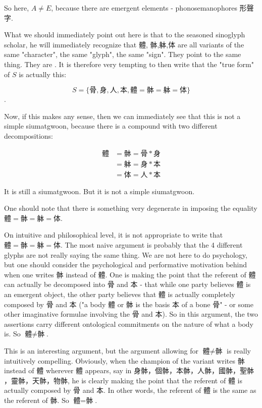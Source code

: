 So here, $A\neq E$, because there are emergent elements - phonosemanophores 形聲字. 

What we should immediately point out here is that to the seasoned sinoglyph scholar, he will immediately recognize that 體, 骵,躰,体 are all variants of the same "character", the same "glyph", the same "sign". They point to the same thing. They are . It is therefore very tempting to then write that the "true form" of $S$ is actually this:



$$S=\{\text{骨}, \text{身}, \text{人}, \text{本}, \text{體} = \text{骵} = \text{躰} = \text{体}\}$$.

Now, if this makes any sense, then we can immediately see that this is not a simple siumatgwoon, because there is a compound with two different decompositions: 


\begin{align}
    \text{體} &= \text{骵} = \text{骨} * \text{身} \\
             &= \text{躰} = \text{身} * \text{本} \\
             &= \text{体} = \text{人} * \text{本}
\end{align}
    
It is still a siumatgwoon. But it is not a simple siumatgwoon. 

One should note that there is something very degenerate in imposing the equality $\text{體} = \text{骵} = \text{躰} = \text{体}$. 

On intuitive and philosophical level, it is not appropriate to write that $\text{體} = \text{骵} = \text{躰} = \text{体}$. The most naive argument is probably that the 4 different glyphs are not really saying the same thing. We are not here to do psychology, but one should consider the psychological and performative motivation behind when one writes $\text{骵}$ instead of $\text{體}$. One is making the point that the referent of $\text{體}$ can actually be decomposed into $\text{骨}$ and $\text{本}$ - that while one party believes $\text{體}$ is an emergent object, the other party believes that $\text{體}$ is actually completely composed by $\text{骨}$ and $\text{本}$ ("a body 體 or 骵 is the basis 本 of a bone 骨" - or some other imaginative formulae involving the 骨 and 本). So in this argument, the two assertions carry different ontological commitments on the nature of what a body is. So $\text{體} \neq \text{骵}$.

This is an interesting argument, but the argument allowing for $\text{體} \neq \text{骵}$ is really intuitively compelling. Obviously, when the champion of the variant writes $\text{骵}$ instead of $\text{體}$ wherever $\text{體}$ appears, say in $\text{身骵}$，$\text{個骵}$，$\text{本骵}$，$\text{人骵}$，$\text{國骵}$，$\text{聖骵}$，$\text{靈骵}$，$\text{天骵}$，$\text{物骵}$, he is clearly making the point that the referent of $\text{體}$ is actually composed by $\text{骨}$ and $\text{本}$. In other words, the referent of $\text{體}$ is the same as the referent of $\text{骵}$. So $\text{體} = \text{骵}$. 

